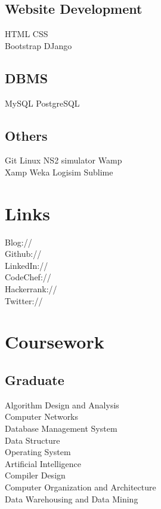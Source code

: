 \documentclass[]{resume-openfont}
\begin{document}
\begin{minipage}[t]{0.33\textwidth}
\subsection{Website Development}
HTML \textbullet{} CSS \\
Bootstrap \textbullet{} DJango
\sectionsep
\subsection{DBMS}
MySQL \textbullet{} PostgreSQL
\sectionsep
\subsection{Others}
Git \textbullet{} Linux \textbullet{} NS2 simulator \textbullet{} Wamp \\ \textbullet{} Xamp \textbullet{} Weka \textbullet{} Logisim \textbullet{} Sublime 
\sectionsep



\section{Links}
Blog:// \href{https://diksha-rathi.github.io}{} \\
Github:// \href{https://github.com/Diksha-Rathi}{} \\
LinkedIn://  \href{https://www.linkedin.com/in/diksharathi}{} \\
CodeChef://  \href{https://www.codechef.com/users/codegirl1995}{} \\
Hackerrank://  \href{https://www.hackerrank.com/codegirl1995}{} \\
Twitter://  \href{https://twitter.com/diksha_28795}{} \\
\sectionsep


\section{Coursework}
\subsection{Graduate}
Algorithm Design and Analysis \\
Computer Networks \\
Database Management System \\
Data Structure \\
Operating System \\
Artificial Intelligence \\
Compiler Design \\
Computer Organization and Architecture \\
Data Warehousing and Data Mining 
\sectionsep


\end{minipage}
\end{document}
